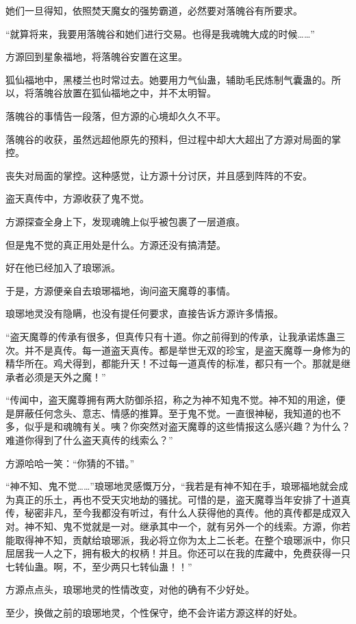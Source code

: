 \begin{this_body}
她们一旦得知，依照焚天魔女的强势霸道，必然要对落魄谷有所要求。

“就算将来，我要用落魄谷和她们进行交易。也得是我魂魄大成的时候……”

方源回到星象福地，将落魄谷安置在这里。

狐仙福地中，黑楼兰也时常过去。她要用力气仙蛊，辅助毛民炼制气囊蛊的。所以，将落魄谷放置在狐仙福地之中，并不太明智。

落魄谷的事情告一段落，但方源的心境却久久不平。

落魄谷的收获，虽然远超他原先的预料，但过程中却大大超出了方源对局面的掌控。

丧失对局面的掌控。这种感觉，让方源十分讨厌，并且感到阵阵的不安。

盗天真传中，方源收获了鬼不觉。

方源探查全身上下，发现魂魄上似乎被包裹了一层道痕。

但是鬼不觉的真正用处是什么。方源还没有搞清楚。

好在他已经加入了琅琊派。

于是，方源便亲自去琅琊福地，询问盗天魔尊的事情。

琅琊地灵没有隐瞒，也没有提任何要求，直接告诉方源许多情报。

“盗天魔尊的传承有很多，但真传只有十道。你之前得到的传承，让我承诺炼蛊三次。并不是真传。每一道盗天真传。都是举世无双的珍宝，是盗天魔尊一身修为的精华所在。鸡犬得到，都能升天！不过每一道真传的标准，都只有一个。那就是继承者必须是天外之魔！”

“传闻中，盗天魔尊拥有两大防御杀招，称之为神不知鬼不觉。神不知的用途，便是屏蔽任何念头、意志、情感的推算。至于鬼不觉。一直很神秘，我知道的也不多，似乎是和魂魄有关。咦？你突然对盗天魔尊的这些情报这么感兴趣？为什么？难道你得到了什么盗天真传的线索么？”

方源哈哈一笑：“你猜的不错。”

“神不知、鬼不觉……”琅琊地灵感慨万分，“我若是有神不知在手，琅琊福地就会成为真正的乐土，再也不受天灾地劫的骚扰。可惜的是，盗天魔尊当年安排了十道真传，秘密非凡，至今我都没有听过，有什么人获得他的真传。他的真传都是成双入对。神不知、鬼不觉就是一对。继承其中一个，就有另外一个的线索。方源，你若能取得神不知，贡献给琅琊派，我必将立你为太上二长老。在整个琅琊派中，你只屈居我一人之下，拥有极大的权柄！并且。你还可以在我的库藏中，免费获得一只七转仙蛊。啊，不，至少两只七转仙蛊！！”

方源点点头，琅琊地灵的性情改变，对他的确有不少好处。

至少，换做之前的琅琊地灵，个性保守，绝不会许诺方源这样的好处。


\end{this_body}
